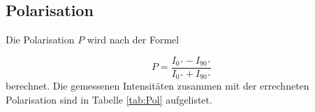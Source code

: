 \subsection{Polarisation}
Die Polarisation $P$ wird nach der Formel

\begin{equation}
    P=\frac{I_{0\,°}-I_{90\,°}}{I_{0\,°}+I_{90\,°}}
\end{equation}
berechnet. Die gemessenen Intensitäten zusammen mit der errechneten Polarisation sind in Tabelle \ref{tab:Pol} aufgelistet.


\begin{table}[H]
    \centering
    \caption{Aufgenommene Intensitäten und berechnete Polarisation für alle vermessenen Proben.}
    \label{tab:Pol}
\end{table}



